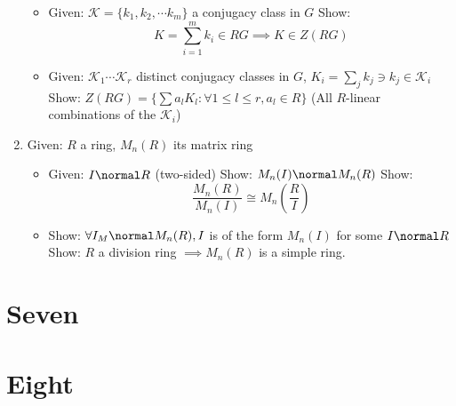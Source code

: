 \begin{enumerate}
  \begin{itemize}
  \tightlist
  \item
    Given: $\mathcal{K} = \{ k_1, k_2, \cdots k_m\}$ a conjugacy class
    in $G$ Show: $$K = \sum_{i=1}^m k_i \in RG \implies K \in Z(RG)$$
  \item
    Given: $\mathcal{K}_1\cdots \mathcal{K}_r$ distinct conjugacy
    classes in $G$, $K_i = \sum_{j}k_j \ni k_j \in \mathcal{K}_i$ Show:
    $Z(RG) = \{\sum a_l K_l : \forall 1 \leq l \leq r, a_l \in R \}$
    (All $R$-linear combinations of the $\mathcal{K}_i$)
  \end{itemize}
\item
  Given: $R$ a ring, $M_n(R)$ its matrix ring

  \begin{itemize}
  \tightlist
  \item
    Given: $I \normal R$ (two-sided) Show: $M_n(I) \normal M_n(R)$ Show:
    $$\frac{M_n(R)}{M_n(I)} \cong M_n(\frac{R}{I})$$
  \item
    Show: $\forall I_M \normal M_n(R), I$ is of the form $M_n(I)$ for
    some $I \normal R$ Show: $R$ a division ring $\implies M_n(R)$ is a
    simple ring.
  \end{itemize}
\end{enumerate}

\hypertarget{seven}{%
\section{Seven}\label{seven}}

\hypertarget{eight}{%
\section{Eight}\label{eight}}





